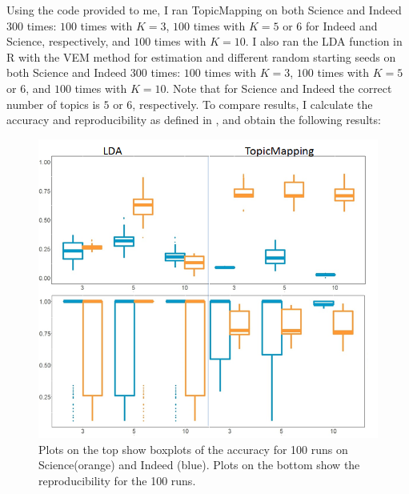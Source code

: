 \documentclass[12pt]{article}
\begin{document}
Using the code provided to me, I ran TopicMapping on both Science and Indeed $300$ times:  $100$ times with $K=3$, $100$ times with $K=5$ or $6$ for Indeed and Science, respectively, and $100$ times with $K=10$. I also ran the LDA function in R with the VEM method for estimation and different random starting seeds on both Science and Indeed $300$ times:  $100$ times with $K=3$, $100$ times with $K=5$ or $6$, and $100$ times with $K=10$. Note that for Science and Indeed the correct number of topics is $5$ or $6$, respectively. To compare results, I calculate the accuracy and reproducibility as defined in \cite{mainExtra}, and obtain the following results: 
\vspace{2mm}
\begin{figure}[H]
	\centering
	\includegraphics[scale=0.5]{Images/results.png}
	\caption{Plots on the top show boxplots of the accuracy for 100 runs on Science(orange) and Indeed (blue). Plots on the bottom show the reproducibility for the 100 runs.}
\end{figure}
\vspace{2mm} 
\end{document}
